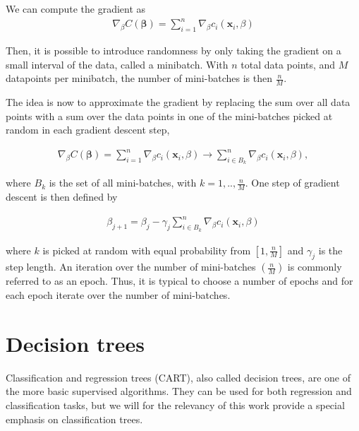 \noindent We can compute the gradient as
\begin{align*}
\nabla_{\beta} C(\boldsymbol{\beta}) =  \sum_{i=1}^{n} \nabla_{\beta} c_i(\boldsymbol{x}_i,\beta)
\end{align*}

\noindent Then, it is possible to introduce randomness by only taking the gradient on a small interval of the data, called a minibatch. With $n$ total data points, and $M$ datapoints per minibatch, the number of mini-batches is then $\frac{n}{M}$.

The idea is now to approximate the gradient by replacing the sum over all data points with a sum over the data points in one of the mini-batches picked at random in each gradient descent step,

\begin{align*}
\nabla_{\beta} C(\boldsymbol{\beta}) =  \sum_{i=1}^{n} \nabla_{\beta} c_i(\boldsymbol{x}_i,\beta) \to \sum_{i \in B_k}^{n} \nabla_{\beta} c_i(\boldsymbol{x}_i,\beta),
\end{align*}

 \noindent where $B_k$ is the set of all mini-batches, with $k=1, ..,\frac{n}{M}$. One step of gradient descent is then defined by

\begin{align*}
\beta_{j+1} = \beta_j - \gamma_j \sum_{i \in B_k}^{n} \nabla_{\beta} c_i(\boldsymbol{x}_i,\beta)
\end{align*}

\noindent where $k$ is picked at random with equal probability from $[1, \frac{n}{M}]$ and $\gamma_j$ is the step length. An iteration over the number of mini-batches $(\frac{n}{M})$ is commonly referred to as an epoch. Thus, it is typical to choose a number of epochs and for each epoch iterate over the number of mini-batches.

\section{Decision trees}
Classification and regression trees (CART), also called decision trees, are one of the more basic supervised algorithms. They can be used for both regression and classification tasks, but we will for the relevancy of this work provide a special emphasis on classification trees.  %

